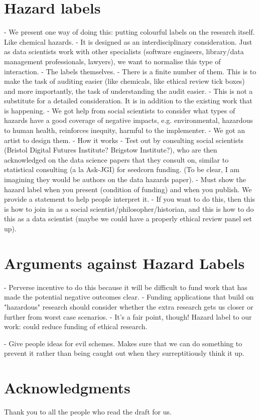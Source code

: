 \documentclass[fleqn,10pt]{olplainarticle}
\begin{document}
\section{Hazard labels}
- We present one way of doing this: putting colourful labels on the research itself. Like chemical hazards. 
  - It is designed as an interdisciplinary consideration. Just as data scientists work with other specialists (software engineers, library/data management professionals, lawyers), we want to normalise this type of interaction.
- The labels themselves.
  - There is a finite number of them. This is to make the task of auditing easier (like chemicals, like ethical review tick boxes) and more importantly, the task of understanding the audit easier.
  - This is not a substitute for a detailed consideration. It is in addition to the existing work that is happening.
  - We got help from social scientists to consider what types of hazards have a good coverage of negative impacts, e.g. environmental, hazardous to human health, reinforces inequity, harmful to the implementer.
  - We got an artist to design them.
- How it works
  - Test out by consulting social scientists (Bristol Digital Futures Institute? Brigstow Institute?), who are then acknowledged on the data science papers that they consult on, similar to statistical consulting (a la Ask-JGI) for seedcorn funding. (To be clear, I am imagining they would be authors on the data hazards paper).
  - Must show the hazard label when you present (condition of funding) and when you publish. We provide a statement to help people interpret it.
  - If you want to do this, then this is how to join in as a social scientist/philosopher/historian, and this is how to do this as a data scientist (maybe we could have a properly ethical review panel set up).

\section*{Arguments against Hazard Labels}

- Perverse incentive to do this because it will be difficult to fund work that has made the potential negative outcomes clear.
  - Funding applications that build on "hazardous" research should consider whether the extra research gets us closer or further from worst case scenarios.
  - It's a fair point, though! Hazard label to our work: could reduce funding of ethical research.
  
- Give people ideas for evil schemes. Makes sure that we can do something to prevent it rather than being caught out when they surreptitiously think it up.

\section*{Acknowledgments}

Thank you to all the people who read the draft for us. 

\printbibliography
\end{document}
